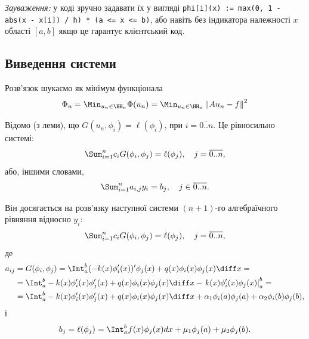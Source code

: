 \textit{Зауваження:} у коді зручно задавати їх у вигляді \texttt{phi[i](x) := max(0, 1 - abs(x - x[i]) / h) * (a <= x <= b)}, або навіть без індикатора належності $x$ області $[a, b]$ якщо це гарантує клієнтський код. \medskip

\subsection{Виведення системи}

Розв'язок шукаємо як мінімум функціонала
\begin{equation}
    \label{eq:2.1.5}
    \Phi_n = \Min_{u_n \in \HH_n} \Phi (u_n) = \Min_{u_n \in \HH_n} \left\| A u_n - f \right\|^2 
\end{equation}

Відомо (з леми), що $G(u_n, \phi_i) = \ell(\phi_i)$, при $i = \overline{0..n}$. Це рівносильно системі:
\begin{equation}
    \label{eq:2.1.6}
    \Sum_{i = 1}^n c_i G(\phi_i, \phi_j) = \ell(\phi_j), \quad j = \overline{0..n},
\end{equation}
або, іншими словами,
\begin{equation}
    \label{eq:2.1.7}
    \Sum_{i = 1}^n a_{i,j} y_i = b_j, \quad j \in \overline{0..n}.
\end{equation}

Він досягається на розв'язку наступної системи $(n+1)$-го алгебраїчного рівняння відносно $y_i$:
\begin{equation}
    \label{eq:2.1.8}
    \Sum_{i = 1}^n c_i G(\phi_i, \phi_j) = \ell(\phi_j), \quad j = \overline{0..n},
\end{equation}
де
\begin{equation}
    \label{eq:2.1.9}
    \begin{aligned}
        a_{ij} &= G(\phi_i, \phi_j) = \Int_a^b (-k(x) \phi_i'(x))' \phi_j(x) + q(x) \phi_i(x) \phi_j(x) \diff x = \\
        &= \Int_a^b -k(x) \phi_i'(x) \phi_j'(x) + q(x) \phi_i(x) \phi_j(x)  \diff x - \left. k(x) \phi_i'(x) \phi_j(x) \right|_a^b = \\
        &= \Int_a^b -k(x) \phi_i'(x) \phi_j'(x) + q(x) \phi_i(x) \phi_j(x) \diff x + \alpha_1 \phi_i(a) \phi_j(a) %
        + \alpha_2 \phi_i(b) \phi_j(b) %
        ,
    \end{aligned}
\end{equation}
і
\begin{equation}
    \label{eq:2.1.10}
    b_j = \ell(\phi_j) = \Int_a^b f(x) \phi_j(x) dx + \mu_1 \phi_j(a) + \mu_2 \phi_j(b).
\end{equation}

